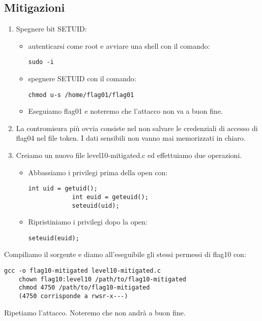 \subsection{Mitigazioni}
\begin{enumerate}
    \item Spegnere bit SETUID:
    \begin{itemize}
        \item autenticarsi come root e avviare una shell con il comando: \begin{lstlisting}[style=bashstyle] 
        sudo -i
        \end{lstlisting}
        \item spegnere SETUID con il comando: \begin{lstlisting}[style=bashstyle] 
        chmod u-s /home/flag01/flag01
        \end{lstlisting}   
        \item Eseguiamo flag01 e noteremo che l’attacco non va a buon fine. 
    \end{itemize}
    \item La contromisura più ovvia consiste nel non salvare le credenziali di accesso di flag04 nel file token. I dati sensibili non vanno mai memorizzati in chiaro.
    \item Creiamo un nuovo file level10-mitigated.c ed effettuiamo due operazioni.
    \begin{itemize}
        \item Abbassiamo i privilegi prima della open con:
        \begin{lstlisting}[style=cstyle]
            int uid = getuid();
            int euid = geteuid();
            seteuid(uid);
        \end{lstlisting}
        \item Ripristiniamo i privilegi dopo la open:
        \begin{lstlisting}[style=cstyle]
            seteuid(euid);
        \end{lstlisting}
    \end{itemize}
\end{enumerate}
Compiliamo il sorgente e diamo all'eseguibile gli stessi permessi di flag10 con:
\begin{lstlisting}[style=bashstyle]
    gcc -o flag10-mitigated level10-mitigated.c
    chown flag10:level10 /path/to/flag10-mitigated 
    chmod 4750 /path/to/flag10-mitigated
    (4750 corrisponde a rwsr-x---)
    \end{lstlisting}
Ripetiamo l'attacco. Noteremo che non andrà a buon fine.

